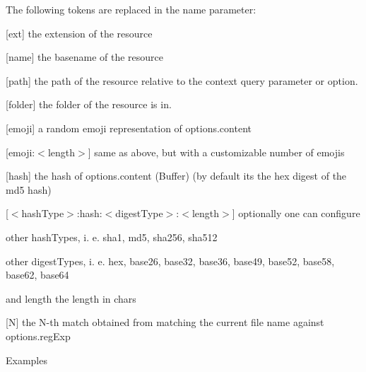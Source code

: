 The following tokens are replaced in the {\ttfamily name} parameter\+:


\begin{DoxyItemize}
\item {\ttfamily \mbox{[}ext\mbox{]}} the extension of the resource
\item {\ttfamily \mbox{[}name\mbox{]}} the basename of the resource
\item {\ttfamily \mbox{[}path\mbox{]}} the path of the resource relative to the {\ttfamily context} query parameter or option.
\item {\ttfamily \mbox{[}folder\mbox{]}} the folder of the resource is in.
\item {\ttfamily \mbox{[}emoji\mbox{]}} a random emoji representation of {\ttfamily options.\+content}
\item {\ttfamily \mbox{[}emoji\+:$<$length$>$\mbox{]}} same as above, but with a customizable number of emojis
\item {\ttfamily \mbox{[}hash\mbox{]}} the hash of {\ttfamily options.\+content} (Buffer) (by default it\textquotesingle{}s the hex digest of the md5 hash)
\item {\ttfamily \mbox{[}$<$hash\+Type$>$\+:hash\+:$<$digest\+Type$>$\+:$<$length$>$\mbox{]}} optionally one can configure
\begin{DoxyItemize}
\item other {\ttfamily hash\+Type}s, i. e. {\ttfamily sha1}, {\ttfamily md5}, {\ttfamily sha256}, {\ttfamily sha512}
\item other {\ttfamily digest\+Type}s, i. e. {\ttfamily hex}, {\ttfamily base26}, {\ttfamily base32}, {\ttfamily base36}, {\ttfamily base49}, {\ttfamily base52}, {\ttfamily base58}, {\ttfamily base62}, {\ttfamily base64}
\item and {\ttfamily length} the length in chars
\end{DoxyItemize}
\item {\ttfamily \mbox{[}N\mbox{]}} the N-\/th match obtained from matching the current file name against {\ttfamily options.\+reg\+Exp}
\end{DoxyItemize}

Examples


